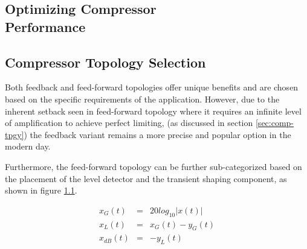\documentclass[10pt]{article}
\begin{document}
\begin{multicols*}{2}
        \section[Optimizing Compressor Performance]{Optimizing Compressor\\Performance}
            
            \subsection{Compressor Topology Selection}
                Both feedback and feed-forward topologies offer unique benefits and are chosen based on the specific requirements of the application. However, due to the inherent setback seen in feed-forward topology where it requires an infinite level of amplification to achieve perfect limiting, (as discussed in section \ref{sec:comp-tpgy}) the feedback variant remains a more precise and popular option in the modern day.\par
                Furthermore, the feed-forward topology can be further sub-categorized based on the placement of the level detector and the transient shaping component, as shown in figure \ref{}.

                    \begin{eqnarray}
                        x_G(t)&=&20log_{10}|x(t)|\\
                        x_L(t)&=&x_G(t)-y_G(t)\\
                        x_{dB}(t)&=&-y_L(t)
                    \end{eqnarray}

                    \begin{figure}[!th]

                        \centering
                        
\end{figure}
\end{multicols*}
\end{document}
